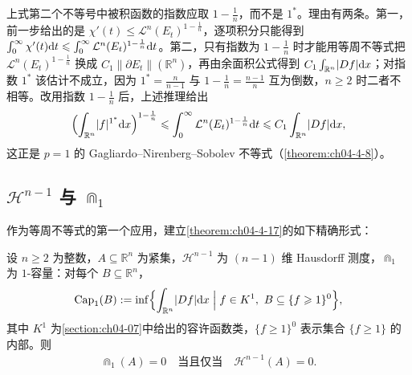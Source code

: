 ﻿\documentclass[../../main.tex]{subfiles}%
\begin{document}
\begin{remark}\label{remark:ch05-thm-5-11-指数}
上式第二个不等号中被积函数的指数应取 $1-\frac1n$，而不是 $1^*$。理由有两条。第一，前一步给出的是 $\chi'(t)\leqslant\mathcal{L}^n(E_t)^{1-\frac1n}$，逐项积分只能得到 $\int_0^{\infty}\chi'(t)\mathrm{d} t\leqslant\int_0^{\infty}\mathcal{L}^n(E_t)^{1-\frac1n}\mathrm{d} t$。第二，只有指数为 $1-\frac1n$ 时才能用等周不等式把 $\mathcal{L}^n(E_t)^{1-\frac1n}$ 换成 $C_1\lVert\partial E_t\rVert(\mathbb{R}^n)$，再由余面积公式得到 $C_1\int_{\mathbb{R}^n}\lvert Df\rvert\mathrm{d} x$；对指数 $1^*$ 该估计不成立，因为 $1^*=\frac{n}{n-1}$ 与 $1-\frac1n=\frac{n-1}{n}$ 互为倒数，$n\geqslant2$ 时二者不相等。改用指数 $1-\frac1n$ 后，上述推理给出
\begin{align*}
\Bigl(\int_{\mathbb{R}^n}\lvert f\rvert^{1^*}\mathrm{d} x\Bigr)^{1-\frac1n}\leqslant\int_0^{\infty}\mathcal{L}^n(E_t)^{1-\frac1n}\mathrm{d} t\leqslant C_1\int_{\mathbb{R}^n}\lvert Df\rvert\mathrm{d} x,
\end{align*}
这正是 $p=1$ 的 Gagliardo--Nirenberg--Sobolev 不等式（\cref{theorem:ch04-4-8}）。%
\end{remark}

\subsection{$\mathcal{H}^{n-1}$ 与 $\Cap_1$}\label{subsection:ch05-06-3}

作为等周不等式的第一个应用，建立\cref{theorem:ch04-4-17}的如下精确形式：%

\begin{theorem}\label{theorem:ch05-5-12}
设 $n\geqslant2$ 为整数，$A\subseteq\mathbb{R}^n$ 为紧集，$\mathcal{H}^{n-1}$ 为 $(n-1)$ 维 Hausdorff 测度，$\Cap_1$ 为 $1$-容量：对每个 $B\subseteq\mathbb{R}^n$，
\begin{align*}
\operatorname{Cap}_1(B):=\inf\Bigl\{\int_{\mathbb{R}^n}\lvert Df\rvert\mathrm{d} x\Bigm| f\in K^1,\ B\subseteq\{f\geqslant1\}^0\Bigr\},
\end{align*}
其中 $K^1$ 为\cref{section:ch04-07}中给出的容许函数类，$\{f\geqslant1\}^0$ 表示集合 $\{f\geqslant1\}$ 的内部。则%
\begin{align*}
\Cap_1(A)=0\quad\text{当且仅当}\quad\mathcal{H}^{n-1}(A)=0 .
\end{align*}
\end{theorem}
\end{document}
